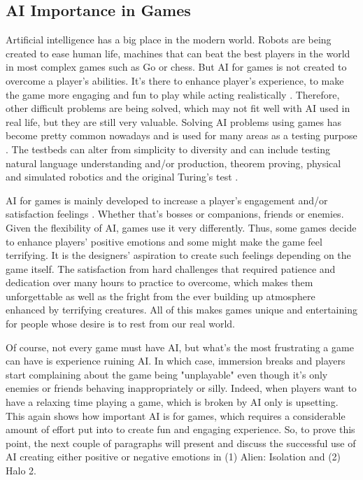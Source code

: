 \documentclass[journal]{IEEEtran}
\begin{document}
\subsection{AI Importance in Games} %
Artificial intelligence has a big place in the modern world. Robots are being created to ease human life, machines that can beat the best players in the world in most complex games such as Go \cite{alphago} or chess. But AI for games is not created to overcome a player's abilities. It's there to enhance player's experience, to make the game more engaging and fun to play \cite{aiinvideogames} while acting realistically \cite{chaslot2008monte}. Therefore, other difficult problems are being solved, which may not fit well with AI used in real life, but they are still very valuable. Solving AI problems using games has become pretty common nowadays and is used for many areas as a testing purpose \cite{schaul2011measuring}. The testbeds can alter from simplicity to diversity \cite{schaul2011measuring} and can include testing natural language understanding and/or production, theorem proving, physical and simulated robotics and the original Turing's test \cite{schaul2011measuring}.

AI for games is mainly developed to increase a player's engagement and/or satisfaction feelings \cite{halo2}. Whether that's bosses or companions, friends or enemies. Given the flexibility of AI, games use it very differently. Thus, some games decide to enhance players' positive emotions and some might make the game feel terrifying. It is the designers' aspiration to create such feelings depending on the game itself. The satisfaction from hard challenges that required patience and dedication over many hours to practice to overcome, which makes them unforgettable as well as the fright from the ever building up atmosphere enhanced by terrifying creatures. All of this makes games unique and entertaining for people whose desire is to rest from our real world.

Of course, not every game must have AI, but what's the most frustrating a game can have is experience ruining AI. In which case, immersion breaks and players start complaining about the game being "unplayable" even though it's only enemies or friends behaving inappropriately or silly. Indeed, when players want to have a relaxing time playing a game, which is broken by AI only is upsetting. This again shows how important AI is for games, which requires a considerable amount of effort put into to create fun and engaging experience. So, to prove this point, the next couple of paragraphs will present and discuss the successful use of AI creating either positive or negative emotions in (1) Alien: Isolation and (2) Halo 2.
\end{document}
